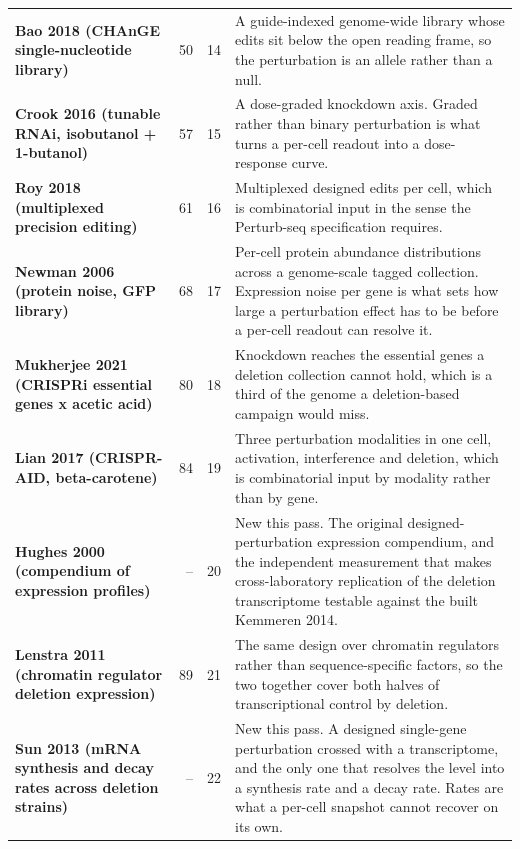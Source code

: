\begin{longtable}{@{}L{46mm} r@{\hspace{6pt}} r@{\hspace{6pt}} L{104mm}@{}}
\addlinespace[5pt]
\textbf{Bao 2018 (CHAnGE single-nucleotide library)} & 50 & 14 & A guide-indexed genome-wide library whose edits sit below the open reading frame, so the perturbation is an allele rather than a null. \\
\addlinespace[5pt]
\textbf{Crook 2016 (tunable RNAi, isobutanol + 1-butanol)} & 57 & 15 & A dose-graded knockdown axis. Graded rather than binary perturbation is what turns a per-cell readout into a dose-response curve. \\
\addlinespace[5pt]
\textbf{Roy 2018 (multiplexed precision editing)} & 61 & 16 & Multiplexed designed edits per cell, which is combinatorial input in the sense the Perturb-seq specification requires. \\
\addlinespace[5pt]
\textbf{Newman 2006 (protein noise, GFP library)} & 68 & 17 & Per-cell protein abundance distributions across a genome-scale tagged collection. Expression noise per gene is what sets how large a perturbation effect has to be before a per-cell readout can resolve it. \\
\addlinespace[5pt]
\textbf{Mukherjee 2021 (CRISPRi essential genes x acetic acid)} & 80 & 18 & Knockdown reaches the essential genes a deletion collection cannot hold, which is a third of the genome a deletion-based campaign would miss. \\
\addlinespace[5pt]
\textbf{Lian 2017 (CRISPR-AID, beta-carotene)} & 84 & 19 & Three perturbation modalities in one cell, activation, interference and deletion, which is combinatorial input by modality rather than by gene. \\
\addlinespace[5pt]
\textbf{Hughes 2000 (compendium of expression profiles)} & -- & 20 & New this pass. The original designed-perturbation expression compendium, and the independent measurement that makes cross-laboratory replication of the deletion transcriptome testable against the built Kemmeren 2014. \\
\addlinespace[5pt]
\textbf{Lenstra 2011 (chromatin regulator deletion expression)} & 89 & 21 & The same design over chromatin regulators rather than sequence-specific factors, so the two together cover both halves of transcriptional control by deletion. \\
\addlinespace[5pt]
\textbf{Sun 2013 (mRNA synthesis and decay rates across deletion strains)} & -- & 22 & New this pass. A designed single-gene perturbation crossed with a transcriptome, and the only one that resolves the level into a synthesis rate and a decay rate. Rates are what a per-cell snapshot cannot recover on its own. \\

\end{longtable}
